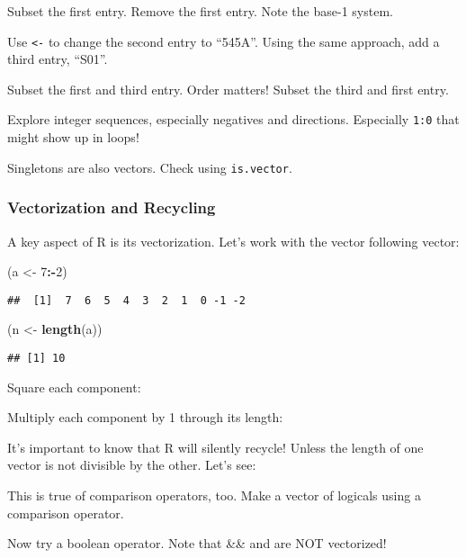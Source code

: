 \documentclass[]{article}
\newenvironment{Shaded}{\begin{snugshade}}{\end{snugshade}}
\newcommand{\KeywordTok}[1]{\textcolor[rgb]{0.13,0.29,0.53}{\textbf{#1}}}
\newcommand{\DecValTok}[1]{\textcolor[rgb]{0.00,0.00,0.81}{#1}}
\newcommand{\StringTok}[1]{\textcolor[rgb]{0.31,0.60,0.02}{#1}}
\newcommand{\OperatorTok}[1]{\textcolor[rgb]{0.81,0.36,0.00}{\textbf{#1}}}
\newcommand{\NormalTok}[1]{#1}
\begin{document}
Subset the first entry. Remove the first entry. Note the base-1 system.

Use \texttt{\textless{}-} to change the second entry to ``545A''. Using
the same approach, add a third entry, ``S01''.

Subset the first and third entry. Order matters! Subset the third and
first entry.

Explore integer sequences, especially negatives and directions.
Especially \texttt{1:0} that might show up in loops!

Singletons are also vectors. Check using \texttt{is.vector}.

\subsubsection{Vectorization and
Recycling}\label{vectorization-and-recycling}

A key aspect of R is its vectorization. Let's work with the vector
following vector:

\begin{Shaded}
\begin{Highlighting}[]
\NormalTok{(a <-}\StringTok{ }\DecValTok{7}\OperatorTok{:-}\DecValTok{2}\NormalTok{)}
\end{Highlighting}
\end{Shaded}

\begin{verbatim}
##  [1]  7  6  5  4  3  2  1  0 -1 -2
\end{verbatim}

\begin{Shaded}
\begin{Highlighting}[]
\NormalTok{(n <-}\StringTok{ }\KeywordTok{length}\NormalTok{(a))}
\end{Highlighting}
\end{Shaded}

\begin{verbatim}
## [1] 10
\end{verbatim}

Square each component:

Multiply each component by 1 through its length:

It's important to know that R will silently recycle! Unless the length
of one vector is not divisible by the other. Let's see:

This is true of comparison operators, too. Make a vector of logicals
using a comparison operator.

Now try a boolean operator. Note that \&\& and \textbar{}\textbar{} are
NOT vectorized!
\end{document}
